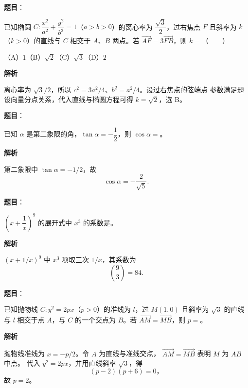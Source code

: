 \begin{answer}

\textbf{题目}：

已知椭圆 $C:\dfrac{x^2}{a^2}+\dfrac{y^2}{b^2}=1$（$a>b>0$）的离心率为 $\dfrac{\sqrt3}{2}$，过右焦点 $F$ 且斜率为 $k$（$k>0$）的直线与 $C$ 相交于 $A\text{、}B$ 两点。若 $\overrightarrow{AF}=3\overrightarrow{FB}$，则 $k=$\mbox{（　　）}

（A）$1$\quad（B）$\sqrt2$\quad（C）$\sqrt3$\quad（D）$2$

\textbf{解析}

离心率为 $\sqrt3/2$，所以 $c^2=3a^2/4$、$b^2=a^2/4$。设过右焦点的弦端点
参数满足题设向量分点关系，代入直线与椭圆方程可得 $k=\sqrt2$，选 B。


\end{answer}
\begin{answer}

\textbf{题目}：

已知 $\alpha$ 是第二象限的角，$\tan\alpha=-\dfrac12$，则 $\cos\alpha=$\gkblank{}。

\textbf{解析}

第二象限中 $\tan\alpha=-1/2$，故
\nopagebreak[4]
\[
\cos\alpha=-\frac{2}{\sqrt5}.
\]


\end{answer}
\begin{answer}

\textbf{题目}：

$\left(x+\dfrac1x\right)^9$ 的展开式中 $x^3$ 的系数是\gkblank{}。

\textbf{解析}

$(x+1/x)^9$ 中 $x^3$ 项取三次 $1/x$，其系数为
\nopagebreak[4]
\[
\binom93=84.
\]


\end{answer}
\begin{answer}

\textbf{题目}：

已知抛物线 $C:y^2=2px$（$p>0$）的准线为 $l$，过 $M(1,0)$ 且斜率为 $\sqrt3$ 的直线与 $l$ 相交于点 $A$，与 $C$ 的一个交点为 $B$。若 $\overrightarrow{AM}=\overrightarrow{MB}$，则 $p=$\gkblank{}。

\textbf{解析}

抛物线准线为 $x=-p/2$。令 $A$ 为直线与准线交点，
$\overrightarrow{AM}=\overrightarrow{MB}$ 表明 $M$ 为 $AB$ 中点。
代入 $y^2=2px$，并用直线斜率 $\sqrt3$，得
\nopagebreak[4]
\[
(p-2)(p+6)=0\text{，}
\]
故 $p=2$。


\end{answer}
